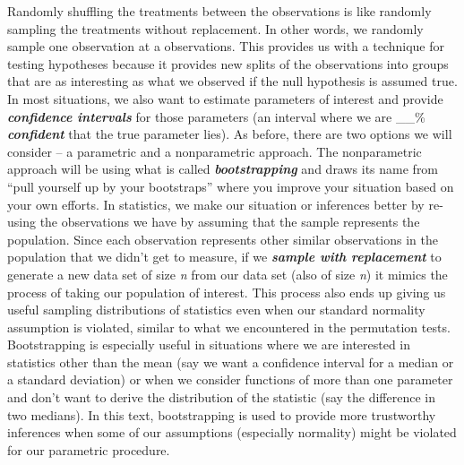 \documentclass[]{book}
\theoremstyle{definition}
\theoremstyle{definition}
\theoremstyle{remark}
\begin{document}
Randomly shuffling the treatments between the observations is like
randomly sampling the treatments without replacement. In other words, we
randomly sample one observation at a observations. This provides us with
a technique for testing hypotheses because it provides new splits of the
observations into groups that are as interesting as what we observed if
the null hypothesis is assumed true. In most situations, we also want to
estimate parameters of interest and provide \textbf{\emph{confidence
intervals}} for those parameters (an interval where we are \_\_\%
\textbf{\emph{confident}} that the true parameter lies). As before,
there are two options we will consider -- a parametric and a
nonparametric approach. The nonparametric approach will be using what is
called \textbf{\emph{bootstrapping}} and draws its name from ``pull
yourself up by your bootstraps'' where you improve your situation based
on your own efforts. In statistics, we make our situation or inferences
better by re-using the observations we have by assuming that the sample
represents the population. Since each observation represents other
similar observations in the population that we didn't get to measure, if
we \textbf{\emph{sample with replacement}} to generate a new data set of
size \emph{n} from our data set (also of size \emph{n}) it mimics the
process of taking our population of interest. This process also ends up
giving us useful sampling distributions of statistics even when our
standard normality assumption is violated, similar to what we
encountered in the permutation tests. Bootstrapping is especially useful
in situations where we are interested in statistics other than the mean
(say we want a confidence interval for a median or a standard deviation)
or when we consider functions of more than one parameter and don't want
to derive the distribution of the statistic (say the difference in two
medians). In this text, bootstrapping is used to provide more
trustworthy inferences when some of our assumptions (especially
normality) might be violated for our parametric procedure.
\end{document}
